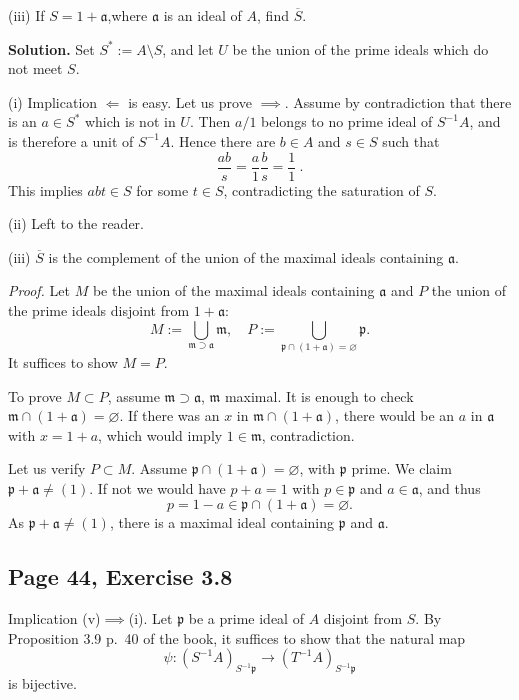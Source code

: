 \documentclass[parskip=half,fontsize=12pt]{scrartcl}%
\newcommand{\mf}{\mathfrak}
\newcommand{\aaa}{\mf a}
\newcommand{\mmm}{\mf m}
\newcommand{\ppp}{\mf p}
\begin{document}
(iii) If $S=1+\aaa$,where $\aaa$ is an ideal of $A$, find $\overline S$.

\textbf{Solution.} Set $S^*:=A\setminus S$, and let $U$ be the union of the prime ideals which do not meet $S$.

(i) Implication $\Longleftarrow$ is easy. Let us prove $\implies$. Assume by contradiction that there is an $a\in S^*$ which is not in $U$. Then $a/1$ belongs to no prime ideal of $S^{-1}A$, and is therefore a unit of $S^{-1}A$. Hence there are $b\in A$ and $s\in S$ such that 
$$
\frac{ab}s=\frac a1\frac bs=\frac11\ .
$$ 
This implies $abt\in S$ for some $t\in S$, contradicting the saturation of $S$.

(ii) Left to the reader.

(iii) $\overline S$ is the complement of the union of the maximal ideals containing $\aaa$. 

\emph{Proof.} Let $M$ be the union of the maximal ideals containing $\aaa$ and $P$ the union of the prime ideals disjoint from $1+\aaa$:
$$
M:=\bigcup_{\mmm\supset\aaa}\mmm,\quad P:=\bigcup_{\ppp\cap(1+\aaa)=\varnothing}\ppp.
$$ 
It suffices to show $M=P$. 

To prove $M\subset P$, assume $\mmm\supset\aaa$, $\mmm$ maximal. It is enough to check $\mmm\cap(1+\aaa)=\varnothing$. If there was an $x$ in $\mmm\cap(1+\aaa)$, there would be an $a$ in $\aaa$ with $x=1+a$, which would imply $1\in\mmm$, contradiction. 

Let us verify $P\subset M$. Assume $\ppp\cap(1+\aaa)=\varnothing$, with $\ppp$ prime. We claim $\ppp+\aaa\ne(1)$. If not we would have $p+a=1$ with $p\in\ppp$ and $a\in\aaa$, and thus 
$$
p=1-a\in\ppp\cap(1+\aaa)=\varnothing.
$$ 
As $\ppp+\aaa\ne(1)$, there is a maximal ideal containing $\ppp$ and $\aaa$.



\subsection{Page 44, Exercise 3.8}%

Implication (v)$\implies$(i). Let $\ppp$ be a prime ideal of $A$ disjoint from $S$. By Proposition 3.9 p.~40 of the book, it suffices to show that the natural map 
$$
\psi:(S^{-1}A)_{S^{-1}\ppp}\to(T^{-1}A)_{S^{-1}\ppp}
$$ 
is bijective. 
\end{document}
